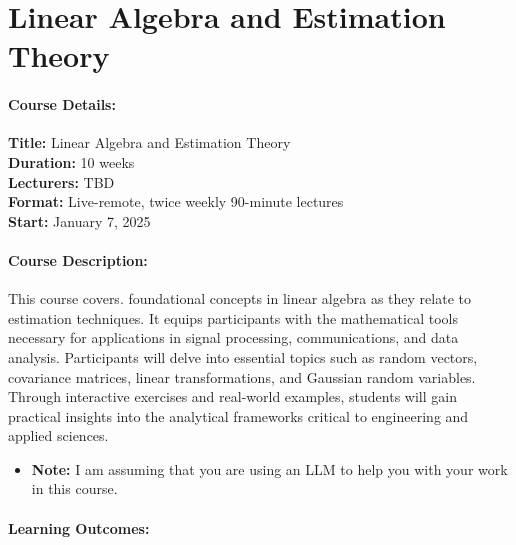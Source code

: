 \documentclass[11pt]{article}
\providecommand{\tightlist}{%
  \setlength{\itemsep}{0pt}\setlength{\parskip}{0pt}}
\begin{document}
\section{Linear Algebra and Estimation
Theory}\label{linear-algebra-and-estimation-theory}

\paragraph{Course Details:}

\textbf{Title:} Linear Algebra and Estimation Theory\\
\textbf{Duration:} 10 weeks\\
\textbf{Lecturers:} TBD\\
\textbf{Format:} Live-remote, twice weekly 90-minute lectures\\
\textbf{Start:} January 7, 2025

\paragraph{Course Description:}

This course covers. foundational concepts in linear algebra as they
relate to estimation techniques. It equips participants with the
mathematical tools necessary for applications in signal processing,
communications, and data analysis. Participants will delve into
essential topics such as random vectors, covariance matrices, linear
transformations, and Gaussian random variables. Through interactive
exercises and real-world examples, students will gain practical insights
into the analytical frameworks critical to engineering and applied
sciences.

\begin{itemize}
\tightlist
\item
  \textbf{Note:} I am assuming that you are using an LLM to help you
  with your work in this course.
\end{itemize}

\paragraph{Learning Outcomes:}
\end{document}
